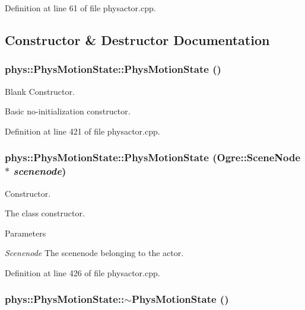 Definition at line 61 of file physactor.cpp.



\subsection{Constructor \& Destructor Documentation}
\hypertarget{classphys_1_1PhysMotionState_ac685ae94d7ee7740aaee8c1a1132b27a}{
\subsubsection[{PhysMotionState}]{\setlength{\rightskip}{0pt plus 5cm}phys::PhysMotionState::PhysMotionState ()}}
\label{dc/d0d/classphys_1_1PhysMotionState_ac685ae94d7ee7740aaee8c1a1132b27a}


Blank Constructor. 

Basic no-\/initialization constructor. 

Definition at line 421 of file physactor.cpp.

\hypertarget{classphys_1_1PhysMotionState_a505aa5ea3bbaba4710924f030f4ed008}{
\subsubsection[{PhysMotionState}]{\setlength{\rightskip}{0pt plus 5cm}phys::PhysMotionState::PhysMotionState (Ogre::SceneNode $\ast$ {\em scenenode})}}
\label{dc/d0d/classphys_1_1PhysMotionState_a505aa5ea3bbaba4710924f030f4ed008}


Constructor. 

The class constructor. 
\begin{DoxyParams}{Parameters}
\item[{\em Scenenode}]The scenenode belonging to the actor. \end{DoxyParams}


Definition at line 426 of file physactor.cpp.

\hypertarget{classphys_1_1PhysMotionState_a20798e3dce2d71a938c3607a8610eaac}{
\subsubsection[{$\sim$PhysMotionState}]{\setlength{\rightskip}{0pt plus 5cm}phys::PhysMotionState::$\sim$PhysMotionState ()}}
\label{dc/d0d/classphys_1_1PhysMotionState_a20798e3dce2d71a938c3607a8610eaac}


